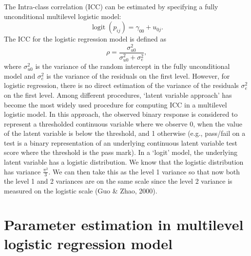 \documentclass[12pt,oneside,a4paper]{reedthesis}
\begin{document}
The Intra-class correlation (ICC) can be estimated by specifying a fully unconditional multilevel logistic model:
\begin{equation} 
\operatorname{logit}\left(p_{i j}\right)=\gamma_{00} + u_{0 j}.
\end{equation}
The ICC for the logistic regression model is defined as
\begin{equation}
\rho=\frac{\sigma_{u0}^{2}}{\sigma_{u0}^{2}+\sigma_{e}^{2}},
\end{equation}
where \(\sigma_{u0}^{2}\) is the variance of the random intercept in the fully unconditional model and \(\sigma^{2}_e\) is the variance of the residuals on the first level.
However, for logistic regression, there is no direct estimation of the variance of the residuals \(\sigma^{2}_e\) on the first level.
Among different procedures, `latent variable approach' has become the most widely used procedure for computing ICC in a multilevel logistic model. In this approach, the observed binary response is considered to represent a thresholded continuous variable where we observe 0, when the value of the latent variable is below the threshold, and 1 otherwise (e.g., pass/fail on a test is a binary representation of an underlying continuous latent variable test score where the threshold is the pass mark). In a `logit' model, the underlying latent variable has a logistic distribution. We know that the logistic distribution has variance \(\frac{\pi^{2}}{3}\). We can then take this as the level 1 variance so that now both the level 1 and 2 variances are on the same scale since the level 2 variance is measured on the logistic scale (Guo \& Zhao, 2000).

\hypertarget{parameter-estimation-in-multilevel-logistic-regression-model}{%
\section{Parameter estimation in multilevel logistic regression model}\label{parameter-estimation-in-multilevel-logistic-regression-model}}
\end{document}
